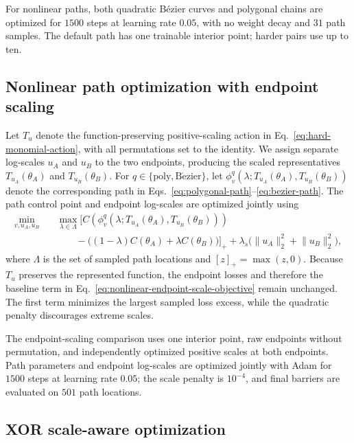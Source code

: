 \documentclass[twoside]{article}
\begin{document}
For nonlinear paths, both quadratic B\'ezier curves and polygonal chains are
optimized for $1500$ steps at learning rate $0.05$, with no weight decay and
$31$ path samples.  The default path has one trainable interior point; harder
pairs use up to ten.

\subsection{Nonlinear path optimization with endpoint scaling}
\label{app:nonlinear-endpoint-scale}

Let $T_u$ denote the function-preserving positive-scaling action in
Eq.~\ref{eq:hard-monomial-action}, with all permutations set to the identity.
We assign separate log-scales $u_A$ and $u_B$ to the two endpoints, producing
the scaled representatives $T_{u_A}(\theta_A)$ and $T_{u_B}(\theta_B)$.
For $q\in\{\mathrm{poly},\mathrm{B\acute ezier}\}$, let
$\phi^q_v(\lambda;T_{u_A}(\theta_A),T_{u_B}(\theta_B))$ denote the
corresponding path in Eqs.~\ref{eq:polygonal-path}--\ref{eq:bezier-path}.  The
path control point and endpoint log-scales are optimized jointly using
\begin{equation}
\begin{aligned}
\min_{v,u_A,u_B}\quad
&\max_{\lambda\in\Lambda}
\Big[
C\!\left(\phi^q_v\!\left(
\lambda;T_{u_A}(\theta_A),T_{u_B}(\theta_B)
\right)\right)\\
&\qquad-\big((1-\lambda)C(\theta_A)+\lambda C(\theta_B)\big)
\Big]_+
+\lambda_s\big(\lVert u_A\rVert_2^2+\lVert u_B\rVert_2^2\big),
\end{aligned}
\label{eq:nonlinear-endpoint-scale-objective}
\end{equation}
where $\Lambda$ is the set of sampled path locations and $[z]_+=\max(z,0)$.
Because $T_u$ preserves the represented function, the endpoint losses and
therefore the baseline term in
Eq.~\ref{eq:nonlinear-endpoint-scale-objective} remain unchanged.  The first
term minimizes the largest sampled loss excess, while the quadratic penalty
discourages extreme scales.

The endpoint-scaling comparison uses one interior point, raw endpoints without
permutation, and independently optimized positive scales at both endpoints.
Path parameters and endpoint log-scales are optimized jointly with Adam for
$1500$ steps at learning rate $0.05$; the scale penalty is $10^{-4}$, and final
barriers are evaluated on $501$ path locations.

\subsection{XOR scale-aware optimization}
\end{document}
